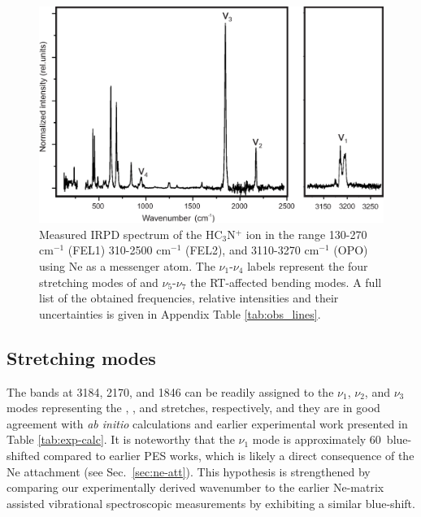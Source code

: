 \begin{figure}
    \centering
    \includegraphics[width=\textwidth,height=\textheight,keepaspectratio]{chapters/HC3N+/full_spectrum_HC3N+.eps}
    \caption{Measured IRPD spectrum of the HC$_3$N$^+$ ion in the range 130-270 cm$^{-1}$ (FEL1) 310-2500 cm$^{-1}$ (FEL2), and 3110-3270 cm$^{-1}$ (OPO) using Ne as a messenger atom. The $\nu_1$-$\nu_4$ labels represent the four stretching modes of \ion and $\nu_5$-$\nu_7$ the RT-affected bending modes.
     A full list of the obtained frequencies, relative intensities and their uncertainties is given in Appendix Table \ref{tab:obs_lines}.}
    \label{fig:HC3N+:IRPD}
\end{figure}

\subsection{Stretching modes}
\label{sec:stretch}
The bands at 3184, 2170, and 1846 \wns can be readily assigned to the $\nu_1$, $\nu_2$, and $\nu_3$ modes representing the , , and  stretches, respectively, and they are in good agreement with \emph{ab initio} calculations and earlier experimental work presented in Table \ref{tab:exp-calc}.
It is noteworthy that the $\nu_1$ mode is approximately 60~\wns blue-shifted compared to earlier PES works, which is likely a direct consequence of the Ne attachment (see Sec.~\ref{sec:ne-att}). 
This hypothesis is strengthened by comparing our experimentally derived wavenumber to the earlier Ne-matrix assisted vibrational spectroscopic measurements by \citet{Smith-Gicklhorn2001VibrationalCations} exhibiting a similar blue-shift.


